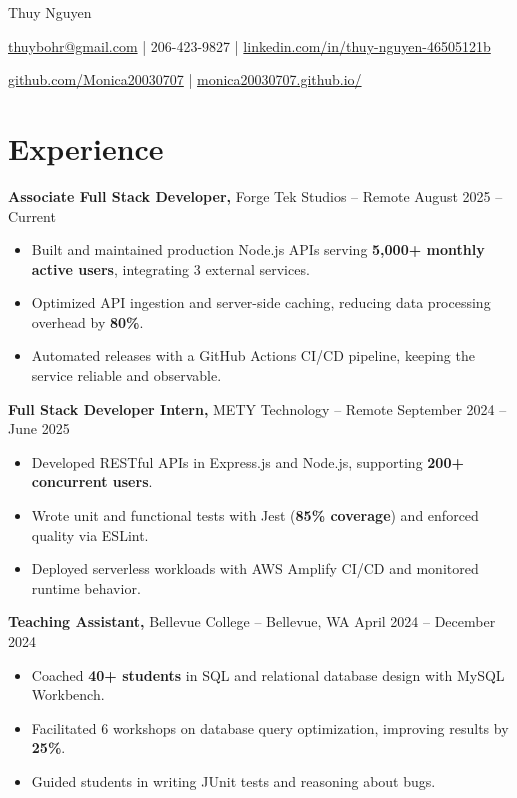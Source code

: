 \documentclass[11pt]{article}
\begin{document}
\centerline{\Huge Thuy Nguyen}

\vspace{5pt}

\centerline{\href{mailto:thuybohr@gmail.com}{thuybohr@gmail.com} | 206-423-9827 |
\href{https://www.linkedin.com/in/thuy-nguyen-46505121b/}{linkedin.com/in/thuy-nguyen-46505121b}}

\centerline{\href{https://github.com/Monica20030707}{github.com/Monica20030707} |
\href{https://monica20030707.github.io/}{monica20030707.github.io/}}

\vspace{-9pt}

\section*{Experience}

\textbf{Associate Full Stack Developer,} {Forge Tek Studios} -- Remote \hfill August 2025 -- Current \\
\vspace{-9pt}
\begin{itemize}
  \item Built and maintained production Node.js APIs serving \textbf{5,000+ monthly active users}, integrating 3 external services.
  \item Optimized API ingestion and server-side caching, reducing data processing overhead by \textbf{80\%}.
  \item Automated releases with a GitHub Actions CI/CD pipeline, keeping the service reliable and observable.
\end{itemize}

\textbf{Full Stack Developer Intern,} {METY Technology} -- Remote \hfill September 2024 -- June 2025 \\
\vspace{-9pt}
\begin{itemize}
  \item Developed RESTful APIs in Express.js and Node.js, supporting \textbf{200+ concurrent users}.
  \item Wrote unit and functional tests with Jest (\textbf{85\% coverage}) and enforced quality via ESLint.
  \item Deployed serverless workloads with AWS Amplify CI/CD and monitored runtime behavior.
\end{itemize}

\textbf{Teaching Assistant,} {Bellevue College} -- Bellevue, WA \hfill April 2024 -- December 2024 \\
\vspace{-9pt}
\begin{itemize}
  \item Coached \textbf{40+ students} in SQL and relational database design with MySQL Workbench.
  \item Facilitated 6 workshops on database query optimization, improving results by \textbf{25\%}.
  \item Guided students in writing JUnit tests and reasoning about bugs.
\end{itemize}
\end{document}
